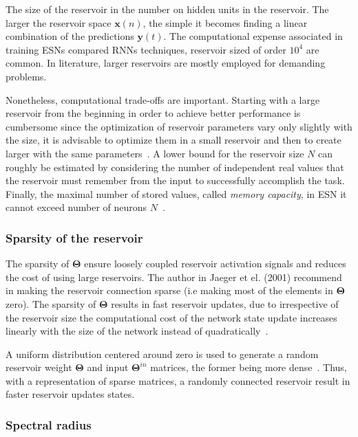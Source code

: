 \documentclass{WitsPhysicsReport}
\begin{document}
The size of the reservoir in the number on hidden units in the reservoir. The larger the reservoir space $\mathbf{x}(n)$, the simple it becomes finding a linear combination of the predictions $\mathbf{y}(t)$. The computational expense associated in training ESNs compared RNNs techniques, reservoir sized of order $10^4$ are common. In literature, larger reservoirs are mostly employed for demanding problems.


Nonetheless, computational trade-offs are important. Starting with a large reservoir from the beginning in order to achieve better performance is cumbersome since the optimization of reservoir parameters vary only slightly with the size, it is advisable to optimize them in a small reservoir and then to create larger with the same parameters~\cite{schrauwen2009computational}. A lower bound for the reservoir size $N$ can roughly be estimated by considering the number of independent real values that the reservoir must remember from the input to successfully accomplish the task.  Finally, the maximal number of stored values, called \textit{memory capacity}, in ESN it cannot exceed number of neurons $N$~\cite{Schaetti2015,lukovsevivcius2012practical}.


\subsubsection{Sparsity of the reservoir}
\label{sec:sparsity_of_the_reservoir}

The sparsity of $\mathbf{\Theta}$ ensure loosely coupled reservoir activation signals and reduces the cost of using large reservoirs. The author in Jaeger et el. (2001) recommend in making the reservoir connection sparse (i.e making most of the elements in $\mathbf{\Theta}$ zero). The sparsity of $\mathbf{\Theta}$ results in fast reservoir updates, due to irrespective of the reservoir size the computational cost of the network state update increases linearly with the size of the network instead of quadratically~\cite{lukovsevivcius2012practical,lukovsevivcius2009reservoir}.

A uniform distribution centered around zero is used to generate a random reservoir weight $\mathbf{\Theta}$ and input $\mathbf{\Theta}^{in}$ matrices, the former being more dense~\cite{jaeger2001echo,lukovsevivcius2012practical}. Thus, with a representation of sparse matrices, a randomly connected reservoir result in faster reservoir updates states. 

\subsubsection{Spectral radius}
\label{sec:Spectral radius}
\end{document}
